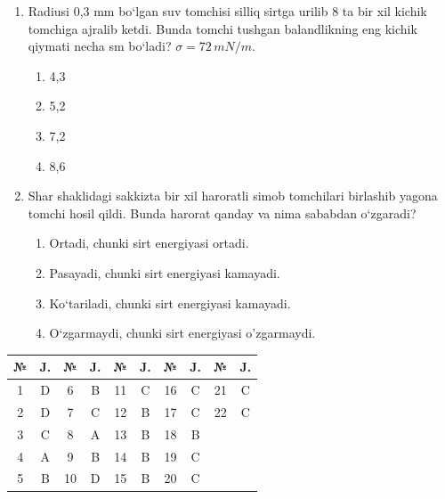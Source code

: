 \begin{enumerate}
\item Radiusi 0,3 mm bo‘lgan suv tomchisi silliq sirtga urilib 8 ta bir xil kichik tomchiga ajralib ketdi. Bunda tomchi tushgan balandlikning eng kichik qiymati necha sm bo‘ladi? $\sigma = 72 \, mN/m$.
\begin{enumerate}[label=\Alph*)]
\item 4,3
\item 5,2
\item 7,2
\item 8,6
\end{enumerate}

\item Shar shaklidagi sakkizta bir xil haroratli simob tomchilari birlashib yagona tomchi hosil qildi. Bunda harorat qanday va nima sababdan o‘zgaradi?
\begin{enumerate}[label=\Alph*)]
\item Ortadi, chunki sirt energiyasi ortadi.
\item Pasayadi, chunki sirt energiyasi kamayadi.
\item Ko‘tariladi, chunki sirt energiyasi kamayadi.
\item O‘zgarmaydi, chunki sirt energiyasi o'zgarmaydi.
\end{enumerate}

\end{enumerate}



\begin{table}[h!]
\centering
\begin{tabular}{|c|c|c|c|c|c|c|c|c|c|}
\hline
№ & J. & № & J. & № & J. & № & J. & № & J. \\ \hline
1 & D & 6 & B & 11 & C & 16 & C & 21 & C \\ \hline
2 & D & 7 & C & 12 & B & 17 & C & 22 & C \\ \hline
3 & C & 8 & A & 13 & B & 18 & B & & \\ \hline
4 & A & 9 & B & 14 & B & 19 & C & & \\ \hline
5 & B & 10 & D & 15 & B & 20 & C & & \\ \hline
\end{tabular}
\end{table}